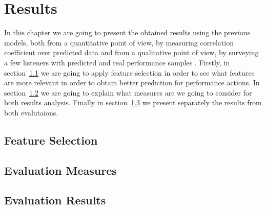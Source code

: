 \chapter{Results}
\label{chap:results}
In this chapter we are going to present the obtained results using the previous models, both from a quantitative point of view, by measuring correlation coefficient over predicted data and from a qualitative point of view, by surveying a few listeners with predicted and real performance samples . Firstly, in section~\ref{sec:features} we are going to apply feature selection in order to see what features are more relevant in order to obtain better prediction for performance actions. In section~\ref{sec:ev_measures} we are going to explain what measures are we going to consider for both results analysis. Finally in section~\ref{sec:ev_results} we present separately the results from both evalutaions.
\section{Feature Selection}
\label{sec:features}
\section{Evaluation Measures}
\label{sec:ev_measures}
\section{Evaluation Results}
\label{sec:ev_results}
\subse

\newpage




\cleardoublepage

